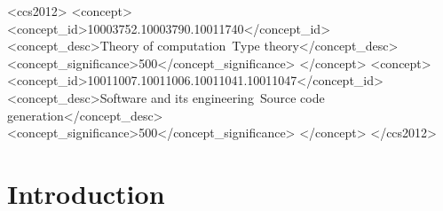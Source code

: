 \documentclass[acmsmall,screen]{acmart}
\theoremstyle{remark}
\begin{document}
\begin{CCSXML}
<ccs2012>
   <concept>
       <concept_id>10003752.10003790.10011740</concept_id>
       <concept_desc>Theory of computation~Type theory</concept_desc>
       <concept_significance>500</concept_significance>
       </concept>
   <concept>
       <concept_id>10011007.10011006.10011041.10011047</concept_id>
       <concept_desc>Software and its engineering~Source code generation</concept_desc>
       <concept_significance>500</concept_significance>
       </concept>
 </ccs2012>
\end{CCSXML}



\maketitle


\section{Introduction}\label{sec:introduction}
\end{document}
